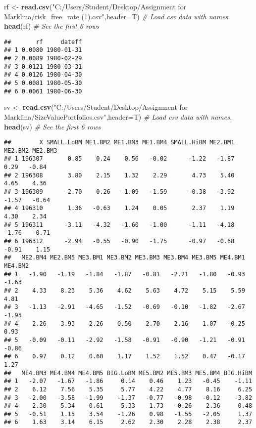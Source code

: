 \documentclass[
]{article}
\newenvironment{Shaded}{\begin{snugshade}}{\end{snugshade}}
\newcommand{\AttributeTok}[1]{\textcolor[rgb]{0.13,0.29,0.53}{#1}}
\newcommand{\CommentTok}[1]{\textcolor[rgb]{0.56,0.35,0.01}{\textit{#1}}}
\newcommand{\FunctionTok}[1]{\textcolor[rgb]{0.13,0.29,0.53}{\textbf{#1}}}
\newcommand{\NormalTok}[1]{#1}
\newcommand{\OtherTok}[1]{\textcolor[rgb]{0.56,0.35,0.01}{#1}}
\newcommand{\StringTok}[1]{\textcolor[rgb]{0.31,0.60,0.02}{#1}}
\begin{document}
\begin{Shaded}
\begin{Highlighting}[]
\NormalTok{rf }\OtherTok{\textless{}{-}} \FunctionTok{read.csv}\NormalTok{(}\StringTok{"C:/Users/Student/Desktop/Assignment for Marklina/risk\_free\_rate (1).csv"}\NormalTok{,}\AttributeTok{header=}\NormalTok{T) }\CommentTok{\# Load csv data with names.}
\FunctionTok{head}\NormalTok{(rf) }\CommentTok{\# See the first 6 rows}
\end{Highlighting}
\end{Shaded}

\begin{verbatim}
##       rf     dateff
## 1 0.0080 1980-01-31
## 2 0.0089 1980-02-29
## 3 0.0121 1980-03-31
## 4 0.0126 1980-04-30
## 5 0.0081 1980-05-30
## 6 0.0061 1980-06-30
\end{verbatim}

\begin{Shaded}
\begin{Highlighting}[]
\NormalTok{sv }\OtherTok{\textless{}{-}} \FunctionTok{read.csv}\NormalTok{(}\StringTok{"C:/Users/Student/Desktop/Assignment for Marklina/SizeValuePortfolios.csv"}\NormalTok{,}\AttributeTok{header=}\NormalTok{T) }\CommentTok{\# Load csv data with names.}
\FunctionTok{head}\NormalTok{(sv) }\CommentTok{\# See the first 6 rows}
\end{Highlighting}
\end{Shaded}

\begin{verbatim}
##        X SMALL.LoBM ME1.BM2 ME1.BM3 ME1.BM4 SMALL.HiBM ME2.BM1 ME2.BM2 ME2.BM3
## 1 196307       0.85    0.24    0.56   -0.02      -1.22   -1.87    0.29   -0.84
## 2 196308       3.80    2.15    1.32    2.29       4.73    5.40    4.65    4.36
## 3 196309      -2.70    0.26   -1.09   -1.59      -0.38   -3.92   -1.57   -0.64
## 4 196310       1.36   -0.63    1.24    0.05       2.37    1.19    4.30    2.34
## 5 196311      -3.11   -4.32   -1.60   -1.00      -1.11   -4.18   -1.76   -0.71
## 6 196312      -2.94   -0.55   -0.90   -1.75      -0.97   -0.68   -0.91    1.15
##   ME2.BM4 ME2.BM5 ME3.BM1 ME3.BM2 ME3.BM3 ME3.BM4 ME3.BM5 ME4.BM1 ME4.BM2
## 1   -1.90   -1.19   -1.84   -1.87   -0.81   -2.21   -1.80   -0.93   -1.63
## 2    4.33    8.23    5.36    4.62    5.63    4.72    5.15    5.59    4.81
## 3   -1.13   -2.91   -4.65   -1.52   -0.69   -0.10   -1.82   -2.67   -1.95
## 4    2.26    3.93    2.26    0.50    2.70    2.16    1.07   -0.25    0.93
## 5   -0.09   -0.11   -2.92   -1.58   -0.91   -0.90   -1.21   -0.91   -0.86
## 6    0.97    0.12    0.60    1.17    1.52    1.52    0.47   -0.17    1.27
##   ME4.BM3 ME4.BM4 ME4.BM5 BIG.LoBM ME5.BM2 ME5.BM3 ME5.BM4 BIG.HiBM
## 1   -2.07   -1.67   -1.86     0.14    0.46    1.23   -0.45    -1.11
## 2    6.12    7.56    5.35     5.77    4.22    4.77    8.16     6.25
## 3   -2.00   -3.58   -1.99    -1.37   -0.77   -0.98   -0.12    -3.82
## 4    2.30    5.34    0.61     5.33    1.73   -0.26    2.36     0.48
## 5   -0.51    1.15    3.54    -1.26    0.98   -1.55   -2.05     1.37
## 6    1.63    3.14    6.15     2.62    2.30    2.28    2.38     2.37
\end{verbatim}
\end{document}
